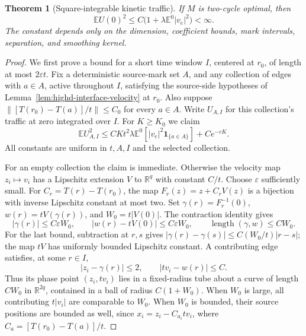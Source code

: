 \documentclass[11pt,reqno]{amsart}
\newtheorem{theorem}{Theorem}[section]
\theoremstyle{definition}
\theoremstyle{remark}
\numberwithin{equation}{section}
\newcommand{\R}{\mathbb R}
\newcommand{\E}{\mathbb E}
\begin{document}
\begin{theorem}[Square-integrable kinetic traffic]
\label{thm:highd-kinetic-traffic}
If \(M\) is two-cycle optimal, then
\begin{equation}
\label{eq:highd-traffic-ltwo}
 \E U(0)^2\le C\bigl(1+\lambda\E^0|v_e|^2\bigr)<\infty.
\end{equation}
The constant depends only on the dimension, coefficient bounds, mark
intervals, separation, and smoothing kernel.
\end{theorem}
\begin{proof}
We first prove a bound for a short time window \(I\), centered at
\(r_0\), of length at most \(2\varepsilon t\). Fix a deterministic
source-mark set \(A\), and any collection of edges with \(a\in A\),
active throughout \(I\), satisfying the source-side hypotheses of
Lemma~\ref{lem:highd-interface-velocity} at \(r_0\). Also suppose
\(\|[T(r_0)-T(a)]/t\|\le C_0\) for every \(a\in A\).
Write \(U_{A,I}\) for this collection's traffic at zero integrated over
\(I\). For \(K\ge K_0\) we claim
\begin{equation}
\label{eq:highd-short-window-traffic}
 \E U_{A,I}^2
 \le CKt^2\lambda\E^0[|v_e|^2\mathbf1_{\{a\in A\}}]
       +Ce^{-cK}.
\end{equation}
All constants are uniform in \(t,A,I\) and the selected collection.

For an empty collection the claim is immediate. Otherwise the
velocity map \(z_i\mapsto v_i\) has a Lipschitz extension \(V\)
to \(\R^q\) with constant \(C/t\). Choose \(\varepsilon\) sufficiently
small. For \(C_r=T(r)-T(r_0)\), the map
\(F_r(z)=z+C_rV(z)\) is a bijection with inverse Lipschitz constant
at most two. Set
\(\gamma(r)=F_r^{-1}(0)\), \(w(r)=tV(\gamma(r))\), and
\(W_0=t|V(0)|\). The contraction identity gives
\[
 |\gamma(r)|\le C\varepsilon W_0,\qquad
 |w(r)-tV(0)|\le C\varepsilon W_0,\qquad
 \operatorname{length}(\gamma,w)\le CW_0.
\]
For the last bound, subtraction at \(r,s\) gives
\(|\gamma(r)-\gamma(s)|\le C(W_0/t)|r-s|\); the map \(tV\)
has uniformly bounded Lipschitz constant. A contributing edge satisfies,
at some \(r\in I\),
\[
 |z_i-\gamma(r)|\le2,\qquad |tv_i-w(r)|\le C.
\]
Thus its phase point \((z_i,tv_i)\) lies in a fixed-radius tube about
a curve of length \(CW_0\) in \(\R^{2q}\), contained in a ball of
radius \(C(1+W_0)\). When \(W_0\) is large, all contributing
\(t|v_i|\) are comparable to \(W_0\). When \(W_0\) is bounded,
their source positions are bounded as well, since
\(x_i=z_i-C_{a_i}tv_i\), where \(C_a=[T(r_0)-T(a)]/t\).


\end{proof}
\end{document}
